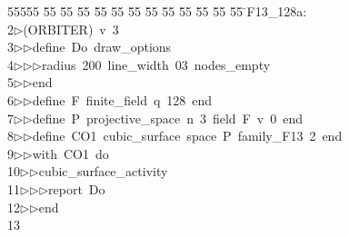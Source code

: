 %
%
\begin{tabbing}
55555 \= 55 \= 55 \= 55 \= 55 \= 55 \= 55 \= 55 \= 55 \= 55 \= 55 \= 55 \= 55 \= \>F13\_128a:\\[0pt]
2\>$\triangleright$\>(ORBITER)\ v\ 3\ \\[0pt]
3\>$\triangleright$\>$\triangleright$\>define\ Do\ draw\_options\ \\[0pt]
4\>$\triangleright$\>$\triangleright$\>$\triangleright$\>radius\ 200\ line\_width\ 03\ nodes\_empty\ \\[0pt]
5\>$\triangleright$\>$\triangleright$\>end\ \\[0pt]
6\>$\triangleright$\>$\triangleright$\>define\ F\ finite\_field\ q\ 128\ end\ \\[0pt]
7\>$\triangleright$\>$\triangleright$\>define\ P\ projective\_space\ n\ 3\ field\ F\ v\ 0\ end\ \\[0pt]
8\>$\triangleright$\>$\triangleright$\>define\ CO1\ cubic\_surface\ space\ P\ family\_F13\ 2\ end\ \\[0pt]
9\>$\triangleright$\>$\triangleright$\>with\ CO1\ do\ \\[0pt]
10\>$\triangleright$\>$\triangleright$\>cubic\_surface\_activity\ \\[0pt]
11\>$\triangleright$\>$\triangleright$\>$\triangleright$\>report\ Do\ \\[0pt]
12\>$\triangleright$\>$\triangleright$\>end\\[0pt]
13\>\end{tabbing}
